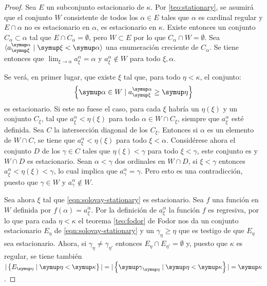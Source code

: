 \documentclass
[
  12pt,
  letterpaper,
  openany,
  oneside,
]{book}
\begin{document}
\newcommand{\seqa}{a_\xi^\alpha}
\begin{proof}
    Sea $E$ un subconjunto estacionario de $\kappa$.
    Por \ref{teo:stationary}, se asumirá que el conjunto $W$
    consistente de todos los $\alpha\in E$ tales que $\alpha$ es cardinal
    regular y $E\cap\alpha$ no es estacionario en $\alpha$, es estacionario en $\kappa$.
    Existe entonces un conjunto \cna{} $C_\alpha\subset\alpha$ tal que $E\cap C_\alpha = \emptyset$,
    pero $W\subset E$ por lo que $C_\alpha\cap W=\emptyset$.
    Sea $\seq{\seqa\mid\xi<\alpha}$ una enumeración creciente de $C_\alpha$.
    Se tiene entonces que $\lim_{\xi\to\alpha}\seqa = \alpha$ y $\seqa\notin W$ para todo $\xi, \alpha$.

    Se verá, en primer lugar, que existe $\xi$ tal que, para todo $\eta<\kappa$, el conjunto:
    \begin{equation}\label{eqn:solovay-stationary}
        \set{\alpha\in W\mid \seqa\geq\eta}
    \end{equation}
    es estacionario. Si este no fuese el caso, para cada $\xi$ habría un $\eta(\xi)$
    y un conjunto \cna{} $C_\xi$, tal que $\seqa < \eta(\xi)$ para todo $\alpha\in W\cap C_\xi$, siempre que $\seqa$
    esté definida. Sea $C$ la intersección diagonal de los $C_\xi$. Entonces si $\alpha$ es un elemento de
    $W\cap C$, se tiene que $\seqa < \eta(\xi)$ para todo $\xi<\alpha$. Considérese ahora el conjunto $D$ de
    los $\gamma\in C$ tales que $\eta(\xi)<\gamma$ para todo $\xi<\gamma$, este conjunto es \cna{}
    y $W\cap D$ es estacionario. Sean $\alpha<\gamma$ dos ordinales en $W\cap D$,
    si $\xi<\gamma$ entonces $\seqa<\eta(\xi)<\gamma$, lo cual implica que $a_\gamma^\alpha = \gamma$.
    Pero esto es una contradicción, puesto que $\gamma\in W$ y $a_\gamma^\alpha\notin W$.

    Sea ahora $\xi$ tal que \ref{eqn:solovay-stationary} es estacionario.
    Sea $f$ una función en $W$ definida por $f(\alpha)=\seqa$. Por la definición de $\seqa$
    la función $f$ es regresiva, por lo que para cada $\eta<\kappa$ el teorema \ref{teo:fodor} de Fodor
    nos da un conjunto estacionario $E_\eta$ de \ref{eqn:solovay-stationary} y un $\gamma_\eta\geq\eta$
    que es testigo de que $E_\eta$ sea estacionario.
    Ahora, si $\gamma_\eta\neq\gamma_{\eta'}$ entonces $E_\eta\cap E_{\eta'} = \emptyset$ y, puesto que $\kappa$ es regular,
    se tiene también $|\set{E_\eta\mid\eta<\kappa}| = |\set{\gamma_\eta\mid\eta<\kappa}| = \kappa$.
\end{proof}
\end{document}

